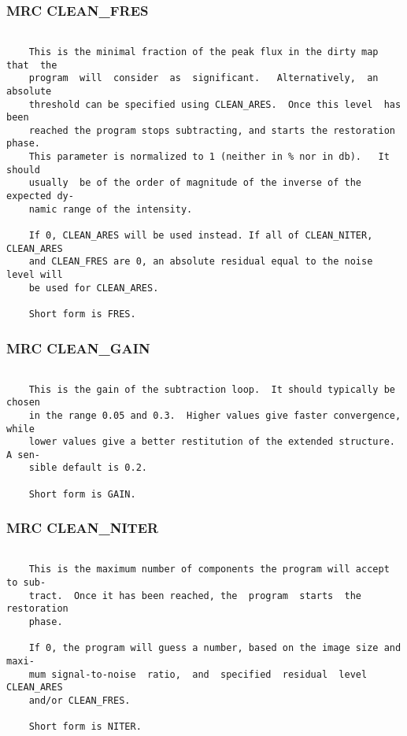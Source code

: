 \subsubsection{MRC CLEAN\_FRES}
\begin{verbatim}

    This is the minimal fraction of the peak flux in the dirty map that  the
    program  will  consider  as  significant.   Alternatively,  an  absolute
    threshold can be specified using CLEAN_ARES.  Once this level  has  been
    reached the program stops subtracting, and starts the restoration phase.
    This parameter is normalized to 1 (neither in % nor in db).   It  should
    usually  be of the order of magnitude of the inverse of the expected dy-
    namic range of the intensity.

    If 0, CLEAN_ARES will be used instead. If all of CLEAN_NITER, CLEAN_ARES
    and CLEAN_FRES are 0, an absolute residual equal to the noise level will
    be used for CLEAN_ARES.

    Short form is FRES.

\end{verbatim}
\subsubsection{MRC CLEAN\_GAIN}
\begin{verbatim}

    This is the gain of the subtraction loop.  It should typically be chosen
    in the range 0.05 and 0.3.  Higher values give faster convergence, while
    lower values give a better restitution of the extended structure. A sen-
    sible default is 0.2.

    Short form is GAIN.

\end{verbatim}
\subsubsection{MRC CLEAN\_NITER}
\begin{verbatim}

    This is the maximum number of components the program will accept to sub-
    tract.  Once it has been reached, the  program  starts  the  restoration
    phase.

    If 0, the program will guess a number, based on the image size and maxi-
    mum signal-to-noise  ratio,  and  specified  residual  level  CLEAN_ARES
    and/or CLEAN_FRES.

    Short form is NITER.

\end{verbatim}
